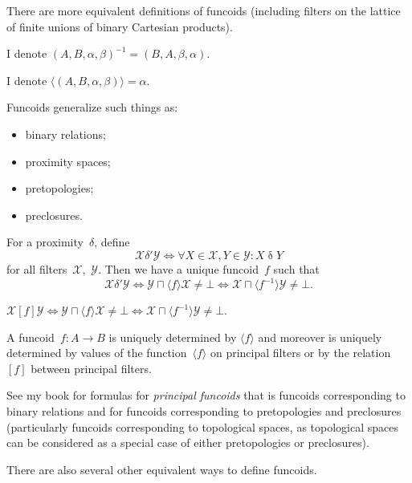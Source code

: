 \documentclass{amsart}
\begin{document}
There are more equivalent definitions of funcoids (including
filters on the lattice of finite unions of binary Cartesian
products).

\begin{defn}
I denote $(A,B,\alpha,\beta)^{-1} = (B,A,\beta,\alpha)$.
\end{defn}

\begin{defn}
I denote $\langle(A,B,\alpha,\beta)\rangle = \alpha$.
\end{defn}

Funcoids generalize such things as:
\begin{itemize}
\item binary relations;
\item proximity spaces;
\item pretopologies;
\item preclosures.
\end{itemize}

For a proximity~$\delta$, define
\[ \mathcal{X}\mathrel{\delta'}\mathcal{Y} \Leftrightarrow \forall X\in\mathcal{X},Y\in\mathcal{Y}: X\mathrel{\delta}Y \]
for all filters~$\mathcal{X}$,~$\mathcal{Y}$.
Then we have a unique funcoid~$f$ such that
\[
\mathcal{X}\mathrel{\delta'}\mathcal{Y} \Leftrightarrow
\mathcal{Y}\sqcap\langle f\rangle\mathcal{X} \ne \bot \Leftrightarrow
\mathcal{X}\sqcap\langle f^{-1}\rangle\mathcal{Y} \ne \bot.
\]

\begin{defn}
$\mathcal{X} \mathrel{[f]} \mathcal{Y} \Leftrightarrow \mathcal{Y}\sqcap\langle f\rangle\mathcal{X} \ne \bot \Leftrightarrow
\mathcal{X}\sqcap\langle f^{-1}\rangle\mathcal{Y} \ne \bot$.
\end{defn}

\begin{prop}
A funcoid~$f: A\rightarrow B$ is uniquely determined by $\langle f\rangle$ and moreover is uniquely
determined by values of the function~$\langle f\rangle$ on principal filters or
by the relation~$[f]$ between principal filters.
\end{prop}

See my book for formulas for \emph{principal funcoids} that is funcoids corresponding to binary relations
and for funcoids corresponding to pretopologies and preclosures (particularly funcoids corresponding to
topological spaces, as topological spaces can be considered as a special case of either pretopologies or preclosures).

There are also several other equivalent ways to define funcoids.
\end{document}
